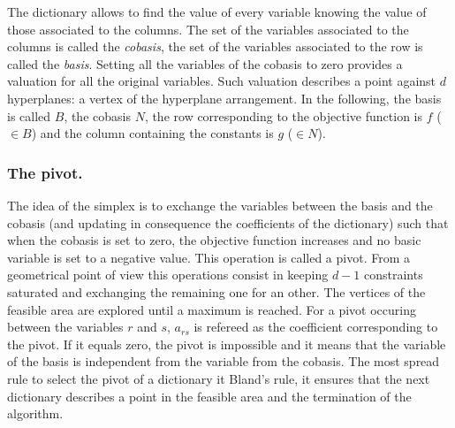 The dictionary allows to find the value of every variable knowing the value of those associated to the columns. The set of the variables associated to the columns is called the \emph{cobasis}, the set of the variables associated to the row is called the \emph{basis}. Setting all the variables of the cobasis to zero provides a valuation for all the original variables. Such valuation describes a point against $d$ hyperplanes: a vertex of the hyperplane arrangement.%
In the following, the basis is called $B$, the cobasis $N$, the row corresponding to the objective function is $f$ ($\in B$) and the column containing the constants is $g$ ($\in N$).  

\subsubsection{The pivot.} 
The idea of the simplex is to exchange the variables between the basis and the cobasis (and updating in consequence the coefficients of the dictionary) such that when the cobasis is set to zero, the objective function increases and no basic variable is set to a negative value. This operation is called a pivot. From a geometrical point of view this operations consist in keeping $d-1$ constraints saturated and exchanging the remaining one for an other.%
The vertices of the feasible area are explored until a maximum is reached. For a pivot occuring between the variables $r$ and $s$, $a_{rs}$ is refereed as the coefficient corresponding to the pivot. If it equals zero, the pivot is impossible and it means that the variable of the basis is independent from the variable from the cobasis. The most spread rule to select the pivot of a dictionary it Bland's rule, it ensures that the next dictionary describes a point in the feasible area and the termination of the algorithm.



